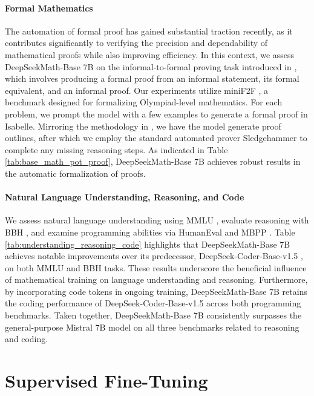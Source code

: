\begin{itemize}[topsep=0pt]
\paragraph{Formal Mathematics}

The automation of formal proof has gained substantial traction recently, as it contributes significantly to verifying the precision and dependability of mathematical proofs while also improving efficiency. In this context, we assess DeepSeekMath-Base 7B on the informal-to-formal proving task introduced in \citep{dsp_proof}, which involves producing a formal proof from an informal statement, its formal equivalent, and an informal proof. Our experiments utilize miniF2F \citep{minif2f}, a benchmark designed for formalizing Olympiad-level mathematics. For each problem, we prompt the model with a few examples to generate a formal proof in Isabelle. Mirroring the methodology in \cite{dsp_proof}, we have the model generate proof outlines, after which we employ the standard automated prover Sledgehammer \citep{sledgehammer} to complete any missing reasoning steps. As indicated in Table \ref{tab:base_math_pot_proof}, DeepSeekMath-Base 7B achieves robust results in the automatic formalization of proofs.

\paragraph{Natural Language Understanding, Reasoning, and Code}

We assess natural language understanding using MMLU \citep{mmlu}, evaluate reasoning with BBH \citep{bbh}, and examine programming abilities via HumanEval \citep{codex} and MBPP \citep{mbpp}. Table \ref{tab:understanding_reasoning_code} highlights that DeepSeekMath-Base 7B achieves notable improvements over its predecessor, DeepSeek-Coder-Base-v1.5 \citep{deepseek-coder}, on both MMLU and BBH tasks. These results underscore the beneficial influence of mathematical training on language understanding and reasoning. Furthermore, by incorporating code tokens in ongoing training, DeepSeekMath-Base 7B retains the coding performance of DeepSeek-Coder-Base-v1.5 across both programming benchmarks. Taken together, DeepSeekMath-Base 7B consistently surpasses the general-purpose Mistral 7B model \citep{mistral} on all three benchmarks related to reasoning and coding.

\section{Supervised Fine-Tuning}


\end{itemize}
